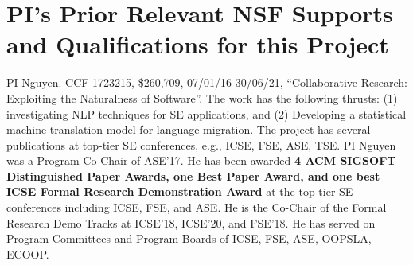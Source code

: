 \section{PI's Prior Relevant NSF Supports and Qualifications for this Project}
\label{prior}

PI Nguyen. CCF-1723215, \$260,709, 07/01/16-30/06/21, ``Collaborative
Research: Exploiting the Naturalness of Software''.
%
 The work has the following
thrusts: (1) investigating NLP techniques for SE
applications, and (2) Developing a statistical machine translation
model for language migration.
%
The project has several publications at top-tier SE
conferences, e.g., ICSE, FSE, ASE, TSE.
%
PI Nguyen was a Program Co-Chair of ASE'17. He has been
awarded {\bf 4 ACM SIGSOFT Distinguished Paper Awards, one Best Paper
  Award, and one best ICSE Formal Research Demonstration Award} at the
top-tier SE conferences including ICSE, FSE, and ASE.
He is the Co-Chair of the Formal Research Demo Tracks at ICSE'18,
ICSE'20, and FSE'18. He has served on Program Committees and Program
Boards of ICSE, FSE, ASE, OOPSLA, ECOOP.




